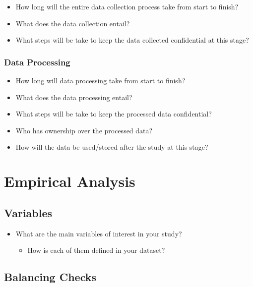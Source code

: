 \documentclass[12pt]{article}
\begin{document}
\begin{itemize}
\item How long will the entire data collection process take from start to finish?
\item What does the data collection entail? 
\item What steps will be take to keep the data collected confidential at this stage?
\end{itemize}

\subsubsection{Data Processing}

\begin{itemize}
\item How long will data processing take from start to finish?
\item What does the data processing entail? 
\item What steps will be take to keep the processed data confidential?
\item Who has ownership over the processed data?
\item How will the data be used/stored after the study at this stage?
\end{itemize}

\section{Empirical Analysis}

\subsection{Variables}

\begin{itemize}
\item What are the main variables of interest in your study?
\begin{itemize}
\item How is each of them defined in your dataset?
\end{itemize}
\end{itemize}

\subsection{Balancing Checks}
\end{document}
